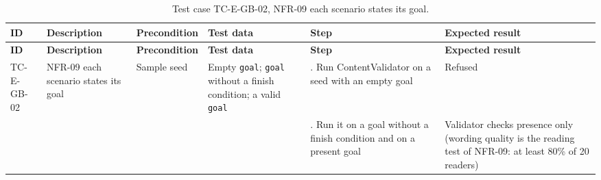 {\footnotesize{}\renewcommand{\arraystretch}{1.1}
\begin{longtable}{|>{\raggedright\arraybackslash}p{}|>{\raggedright\arraybackslash}p{}|>{\raggedright\arraybackslash}p{}|>{\raggedright\arraybackslash}p{}|>{\raggedright\arraybackslash}p{}|>{\raggedright\arraybackslash}p{}|}
\caption{Test case TC-E-GB-02, NFR-09 each scenario states its goal.} \\
\hline
\textbf{ID} & \textbf{Description} & \textbf{Precondition} & \textbf{Test data} & \textbf{Step} & \textbf{Expected result} \\ \hline
\endfirsthead
\hline
\textbf{ID} & \textbf{Description} & \textbf{Precondition} & \textbf{Test data} & \textbf{Step} & \textbf{Expected result} \\ \hline
\endhead
TC-E-GB-02 & NFR-09 each scenario states its goal & Sample seed & Empty \texttt{goal}; \texttt{goal} without a finish condition; a valid \texttt{goal} & 1. Run ContentValidator on a seed with an empty goal & Refused \\ \cline{5-6}
 &  &  &  & 2. Run it on a goal without a finish condition and on a present goal & Validator checks presence only (wording quality is the reading test of NFR-09: at least 80\% of 20 readers) \\ \hline
\end{longtable}
}

